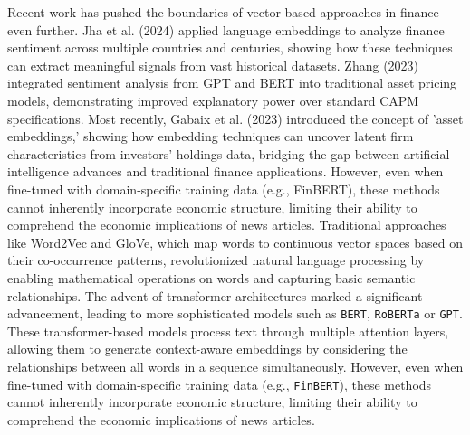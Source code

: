 Recent work has pushed the boundaries of vector-based approaches in finance even further. Jha et al. (2024) applied language embeddings to analyze finance sentiment across multiple countries and centuries, showing how these techniques can extract meaningful signals from vast historical datasets. Zhang (2023) integrated sentiment analysis from GPT and BERT into traditional asset pricing models, demonstrating improved explanatory power over standard CAPM specifications. Most recently, Gabaix et al. (2023) introduced the concept of 'asset embeddings,' showing how embedding techniques can uncover latent firm characteristics from investors' holdings data, bridging the gap between artificial intelligence advances and traditional finance applications.
However, even when fine-tuned with domain-specific training data (e.g., FinBERT), these methods cannot inherently incorporate economic structure, limiting their ability to comprehend the economic implications of news articles.
Traditional approaches like Word2Vec and GloVe, which map words to continuous vector spaces based on their co-occurrence patterns, revolutionized natural language processing by enabling mathematical operations on words and capturing basic semantic relationships. The advent of transformer architectures marked a significant advancement, leading to more sophisticated models such as \texttt{BERT}, \texttt{RoBERTa} or \texttt{GPT}. These transformer-based models process text through multiple attention layers, allowing them to generate context-aware embeddings by considering the relationships between all words in a sequence simultaneously. However, even when fine-tuned with domain-specific training data (e.g., \texttt{FinBERT}), these methods cannot inherently incorporate economic structure, limiting their ability to comprehend the economic implications of news articles.


